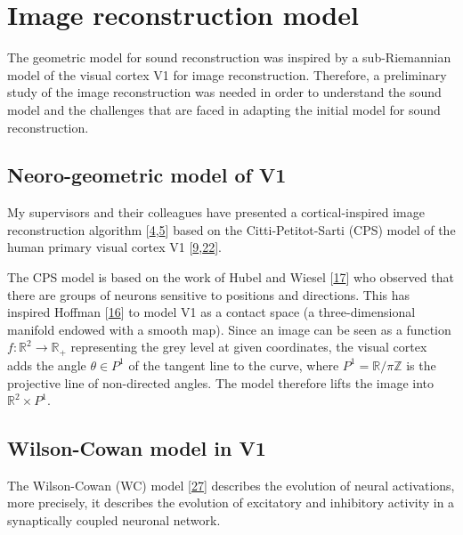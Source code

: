 \documentclass[american,]{article}
\theoremstyle{definition}
\theoremstyle{definition}
\theoremstyle{definition}
\theoremstyle{remark}
\begin{document}
\pagebreak

\hypertarget{image-reconstruction-model}{%
\section{Image reconstruction model}\label{image-reconstruction-model}}

The geometric model for sound reconstruction was inspired by
a sub-Riemannian model of the visual cortex V1 for image reconstruction.
Therefore, a preliminary study of the image reconstruction was needed
in order to understand the sound model and the challenges that are
faced in adapting the initial model for sound reconstruction.

\hypertarget{neoro-geometric-model-of-v1}{%
\subsection{Neoro-geometric model of V1}\label{neoro-geometric-model-of-v1}}

My supervisors and their colleagues have presented a cortical-inspired
image reconstruction algorithm {[}\protect\hyperlink{ref-bertalmio2018}{4},\protect\hyperlink{ref-boscain2017}{5}{]} based
on the Citti-Petitot-Sarti (CPS) model of the human primary visual cortex V1 {[}\protect\hyperlink{ref-citti2006}{9},\protect\hyperlink{ref-petitot1999}{22}{]}.

The CPS model is based on the work of Hubel and Wiesel {[}\protect\hyperlink{ref-hubel1959}{17}{]} who observed that there are
groups of neurons sensitive to positions and directions.
This has inspired Hoffman {[}\protect\hyperlink{ref-hoffman1989}{16}{]} to model V1 as a contact space
(a three-dimensional manifold endowed with a smooth map).
Since an image can be seen as a function \(f:\mathbb{R}^2\rightarrow\mathbb{R}_+\) representing
the grey level at given coordinates, the visual cortex adds
the angle \(\theta\in P^1\) of the tangent line to the curve,
where \(P^1=\mathbb{R}/\pi\mathbb{Z}\) is the projective line of non-directed angles.
The model therefore lifts the image into \(\mathbb{R}^2\times P^1\).

\hypertarget{wilson-cowan-model-in-v1}{%
\subsection{Wilson-Cowan model in V1}\label{wilson-cowan-model-in-v1}}

The Wilson-Cowan (WC) model {[}\protect\hyperlink{ref-wilson1972}{27}{]} describes the evolution of neural activations,
more precisely, it describes the evolution of excitatory and inhibitory activity in
a synaptically coupled neuronal network.
\end{document}
